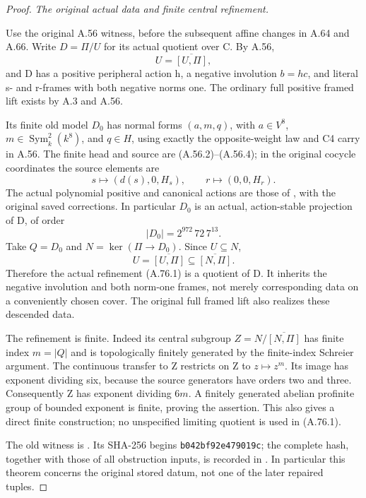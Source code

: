 \begin{proof}
\emph{The original actual data and finite central refinement.}\par
Use the original A.56 witness, before the subsequent affine changes
in A.64 and A.66. Write \(D=\Pi/U\) for its actual quotient over C.
By A.56,
\[
 U=\overline{[U,\Pi]},
\]
and D has a positive peripheral action h, a negative involution
\(b=hc\), and literal s- and r-frames with both negative norms one.
The ordinary full positive framed lift exists by A.3 and A.56.

Its finite old model \(D_0\) has normal forms \((a,m,q)\),
with \(a\in V^8\), \(m\in\operatorname{Sym}^2_k(k^8)\),
and \(q\in H\), using exactly the opposite-weight law and
C4 carry in A.56. The finite head and source are (A.56.2)--(A.56.4);
in the original cocycle coordinates the source elements are
\[
 s\longmapsto(d(s),0,H_s),\qquad
 r\longmapsto(0,0,H_r).
\]
The actual polynomial positive and canonical actions are those of
, with the original saved
corrections. In particular \(D_0\) is an actual, action-stable
projection of D, of order
\[
                         |D_0|=2^{972}\,72\,7^{13}.
 \tag{A.76.3}
\]
Take \(Q=D_0\) and \(N=\ker(\Pi\to D_0)\). Since \(U\subseteq N\),
\[
 U=\overline{[U,\Pi]}\subseteq\overline{[N,\Pi]}.
 \tag{A.76.4}
\]
Therefore the actual refinement (A.76.1) is a quotient of D.
It inherits the negative involution and both norm-one frames,
not merely corresponding data on a conveniently chosen cover.
The original full framed lift also realizes these descended data.

The refinement is finite. Indeed its central subgroup
\(Z=N/\overline{[N,\Pi]}\) has finite index \(m=|Q|\)
and is topologically finitely generated by the finite-index
Schreier argument. The continuous transfer to Z restricts on Z
to \(z\mapsto z^m\). Its image has exponent dividing six,
because the source generators have orders two and three.
Consequently Z has exponent dividing \(6m\). A finitely generated
abelian profinite group of bounded exponent is finite, proving
the assertion. This also gives a direct finite construction;
no unspecified limiting quotient is used in (A.76.1).

The old witness is
.
Its SHA-256 begins \texttt{b042bf92e479019c}; the complete hash,
together with those of all obstruction inputs, is recorded in
.
In particular this theorem concerns the original stored datum,
not one of the later repaired tuples.


\end{proof}
